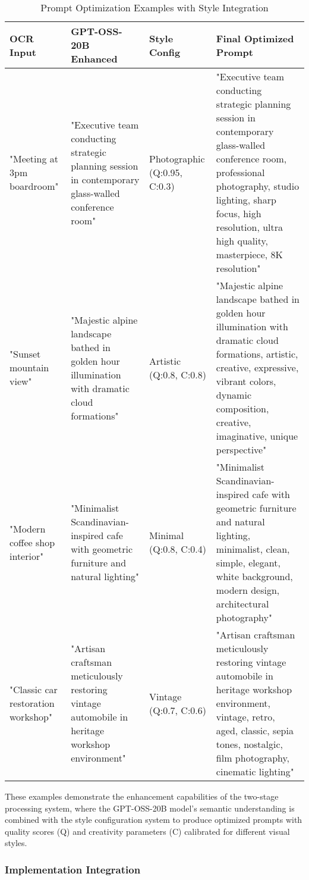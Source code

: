 \begin{table}[H]
\centering
\caption{Prompt Optimization Examples with Style Integration}
\label{tab:prompt_examples}
{\begin{tabular}{p{2.2cm}p{3.5cm}p{2.3cm}p{6cm}}
\toprule
\textbf{OCR Input} & \textbf{GPT-OSS-20B Enhanced} & \textbf{Style Config} & \textbf{Final Optimized Prompt} \\
\midrule
"Meeting at 3pm boardroom" & "Executive team conducting strategic planning session in contemporary glass-walled conference room" & Photographic (Q:0.95, C:0.3) & "Executive team conducting strategic planning session in contemporary glass-walled conference room, professional photography, studio lighting, sharp focus, high resolution, ultra high quality, masterpiece, 8K resolution" \\
\midrule
"Sunset mountain view" & "Majestic alpine landscape bathed in golden hour illumination with dramatic cloud formations" & Artistic (Q:0.8, C:0.8) & "Majestic alpine landscape bathed in golden hour illumination with dramatic cloud formations, artistic, creative, expressive, vibrant colors, dynamic composition, creative, imaginative, unique perspective" \\
\midrule
"Modern coffee shop interior" & "Minimalist Scandinavian-inspired cafe with geometric furniture and natural lighting" & Minimal (Q:0.8, C:0.4) & "Minimalist Scandinavian-inspired cafe with geometric furniture and natural lighting, minimalist, clean, simple, elegant, white background, modern design, architectural photography" \\
\midrule
"Classic car restoration workshop" & "Artisan craftsman meticulously restoring vintage automobile in heritage workshop environment" & Vintage (Q:0.7, C:0.6) & "Artisan craftsman meticulously restoring vintage automobile in heritage workshop environment, vintage, retro, aged, classic, sepia tones, nostalgic, film photography, cinematic lighting" \\
\bottomrule
\end{tabular}}
\end{table}

These examples demonstrate the enhancement capabilities of the two-stage processing system, where the GPT-OSS-20B model's semantic understanding is combined with the style configuration system to produce optimized prompts with quality scores (Q) and creativity parameters (C) calibrated for different visual styles.

\subsubsection{Implementation Integration}

